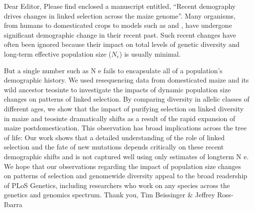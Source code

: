 \documentclass[]{article}
\begin{document}
Dear Editor, 
Please find enclosed a manuscript entitled, ``Recent demography drives changes in linked selection across the maize genome''. 
Many organisms, from humans to domesticated crops to models such as  and , have undergone significant demographic change in their recent past.  
Such recent changes have often been ignored because their impact on total levels of genetic diversity and long-term effective population size ($N_e$) is usually minimal.

But a single number such as N e fails to encapsulate all of a population’s demographic history. 
We used resequencing data from domesticated maize and its wild ancestor teosinte to investigate the impacts of dynamic population size changes on patterns of linked selection. By comparing diversity in allelic classes of different ages, we show that the impact of purifying selection on linked diversity in maize and teosinte dramatically shifts as a result of the rapid expansion of maize post­domestication. This observation has broad implications across the tree of life: Our work shows that a detailed understanding of the role of linked selection and the fate of new mutations depends critically on these recent demographic shifts and is not captured well using only estimates of long­term N e. 
We hope that our observations regarding the impact of population size changes on patterns of selection and genome­wide diversity appeal to the broad readership of PLoS Genetics, including researchers who work on any species across the genetics and genomics spectrum. 
Thank you, Tim Beissinger & Jeffrey Ross­-Ibarra 
\end{document}
